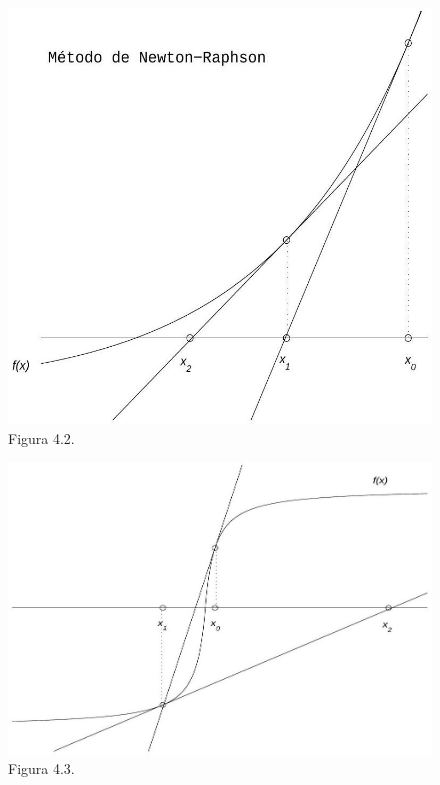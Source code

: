 \documentclass[10pt]{book}
\begin{document}
\begin{figure}[h]
\begin{center}
  \includegraphics[width=\textwidth]{2025_09_05_3888c9ac96bd653d96b4g-074(1)}
\captionsetup{labelformat=empty}
\caption{Figura 4.2.}
\end{center}
\end{figure}

\begin{figure}[h]
\begin{center}
  \includegraphics[width=\textwidth]{2025_09_05_3888c9ac96bd653d96b4g-074}
\captionsetup{labelformat=empty}
\caption{Figura 4.3.}
\end{center}
\end{figure}
\end{document}
